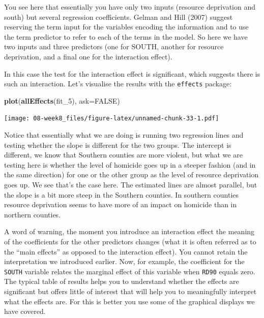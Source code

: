 \documentclass[]{book}
\newenvironment{Shaded}{\begin{snugshade}}{\end{snugshade}}
\newcommand{\DataTypeTok}[1]{\textcolor[rgb]{0.13,0.29,0.53}{#1}}
\newcommand{\DecValTok}[1]{\textcolor[rgb]{0.00,0.00,0.81}{#1}}
\newcommand{\KeywordTok}[1]{\textcolor[rgb]{0.13,0.29,0.53}{\textbf{#1}}}
\newcommand{\NormalTok}[1]{#1}
\newcommand{\OtherTok}[1]{\textcolor[rgb]{0.56,0.35,0.01}{#1}}
\begin{document}
You see here that essentially you have only two inputs (resource deprivation and south) but several regression coefficients. Gelman and Hill (2007) suggest reserving the term input for the variables encoding the information and to use the term predictor to refer to each of the terms in the model. So here we have two inputs and three predictors (one for SOUTH, another for resource deprivation, and a final one for the interaction effect).

In this case the test for the interaction effect is significant, which suggests there is such an interaction. Let's visualise the results with the \texttt{effects} package:

\begin{Shaded}
\begin{Highlighting}[]
\KeywordTok{plot}\NormalTok{(}\KeywordTok{allEffects}\NormalTok{(fit_}\DecValTok{5}\NormalTok{), }\DataTypeTok{ask=}\OtherTok{FALSE}\NormalTok{)}
\end{Highlighting}
\end{Shaded}

\texttt{[image: 08-week8\_files/figure-latex/unnamed-chunk-33-1.pdf]}

Notice that essentially what we are doing is running two regression lines and testing whether the slope is different for the two groups. The intercept is different, we know that Southern counties are more violent, but what we are testing here is whether the level of homicide goes up in a steeper fashion (and in the same direction) for one or the other group as the level of resource deprivation goes up. We see that's the case here. The estimated lines are almost parallel, but the slope is a bit more steep in the Southern counties. In southern counties resource deprivation seems to have more of an impact on homicide than in northern counties.

A word of warning, the moment you introduce an interaction effect the meaning of the coefficients for the other predictors changes (what it is often referred as to the ``main effects'' as opposed to the interaction effect). You cannot retain the interpretation we introduced earlier. Now, for example, the coefficient for the \texttt{SOUTH} variable relates the marginal effect of this variable when \texttt{RD90} equals zero. The typical table of results helps you to understand whether the effects are significant but offers little of interest that will help you to meaningfully interpret what the effects are. For this is better you use some of the graphical displays we have covered.
\end{document}
